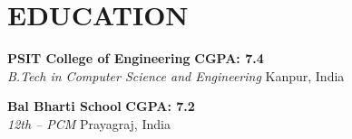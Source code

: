 \documentclass[10pt,a4paper]{article}
\begin{document}
\vspace{4pt}

\section{EDUCATION}

\textbf{PSIT College of Engineering} \hfill \textbf{CGPA: 7.4} \\
\textit{B.Tech in Computer Science and Engineering} \hfill Kanpur, India

\vspace{4pt}

\textbf{Bal Bharti School} \hfill \textbf{CGPA: 7.2} \\
\textit{12th -- PCM} \hfill Prayagraj, India
\end{document}

